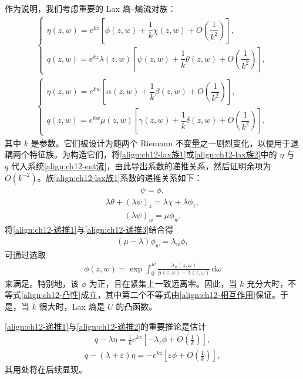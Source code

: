 \documentclass[../../main.tex]{subfiles}
\begin{document}
作为说明，我们考虑重要的 Lax 熵--熵流对族：
\begin{align}
\begin{cases}
\eta(z,w)=e^{kz}\left[\phi(z,w)+\dfrac{1}{k}\chi(z,w)+O\!\left(\dfrac{1}{k^2}\right)\right],\\[1mm]
q(z,w)=e^{kz}\lambda(z,w)\left[\psi(z,w)+\dfrac{1}{k}\theta(z,w)+O\!\left(\dfrac{1}{k^2}\right)\right],
\end{cases}
\label{align:ch12-lax族1}
\end{align}
\begin{align}
\begin{cases}
\eta(z,w)=e^{kw}\left[\alpha(z,w)+\dfrac{1}{k}\beta(z,w)+O\!\left(\dfrac{1}{k^2}\right)\right],\\[1mm]
q(z,w)=e^{kw}\mu(z,w)\left[\gamma(z,w)+\dfrac{1}{k}\delta(z,w)+O\!\left(\dfrac{1}{k^2}\right)\right],
\end{cases}
\label{align:ch12-lax族2}
\end{align}
其中 $k$ 是参数。它们被设计为随两个 Riemann 不变量之一剧烈变化，以便用于退耦两个特征族。为构造它们，将\eqref{align:ch12-lax族1}或\eqref{align:ch12-lax族2}中的 $\eta$ 与 $q$ 代入系统\eqref{align:ch12-ent流}，由此导出系数的递推关系，然后证明余项为 $O(k^{-2})$。族\eqref{align:ch12-lax族1}系数的递推关系如下：
\begin{align}
\psi=\phi,
\label{align:ch12-递推1}
\end{align}
\begin{align}
\lambda\theta+(\lambda\psi)_z=\lambda\chi+\lambda\phi_z,
\label{align:ch12-递推2}
\end{align}
\begin{align}
(\lambda\psi)_w=\mu\phi_w.
\label{align:ch12-递推3}
\end{align}
将\eqref{align:ch12-递推1}与\eqref{align:ch12-递推3}结合得
\begin{align}
(\mu-\lambda)\phi_w=\lambda_w\phi,
\label{align:ch12-phi方程}
\end{align}
可通过选取
\begin{align}
\phi(z,w)=\exp\int_0^w\frac{\lambda_w(z,\omega)}{\mu(z,\omega)-\lambda(z,\omega)}\,\mathrm{d}\omega
\label{align:ch12-phi显式}
\end{align}
来满足。特别地，该 $\phi$ 为正，且在紧集上一致远离零。因此，当 $k$ 充分大时，不等式\eqref{align:ch12-凸性}成立，其中第二个不等式由\eqref{align:ch12-相互作用}保证。于是，当 $k$ 很大时，Lax 熵是 $U$ 的凸函数。

\eqref{align:ch12-递推1}与\eqref{align:ch12-递推2}的重要推论是估计
\begin{align}
q-\lambda\eta=\frac{1}{k}e^{kz}\left[-\lambda_z\phi+O\!\left(\frac{1}{k}\right)\right],
\label{align:ch12-估计1}
\end{align}
\begin{align}
q-(\lambda+\varepsilon)\eta=-e^{kz}\left[\varepsilon\phi+O\!\left(\frac{1}{k}\right)\right],
\label{align:ch12-估计2}
\end{align}
其用处将在后续显现。
\end{document}
